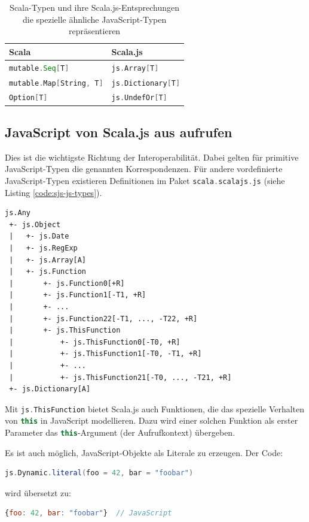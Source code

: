 \documentclass[a4paper, 12pt, hidelinks, listof=totoc, listoftables=totoc, bibliography=totoc]{scrreprt}
\newcommand{\scala}[1]{\lstinline[language=Scala, style=inline]|#1|}
\newcommand{\js}[1]{\lstinline[language=JavaScript, style=inline]|#1|}
\begin{document}
\medskip

\begin{table}[!h]
\begin{tabular}{|l|l|}
\hline \textbf{Scala}                 & \textbf{Scala.js} \\ 
\hline \scala{mutable.Seq[T]}         & \scala{js.Array[T]} \\ 
\hline \scala{mutable.Map[String, T]} & \scala{js.Dictionary[T]} \\ 
\hline \scala{Option[T]}              & \scala{js.UndefOr[T]} \\ 
\hline 
\end{tabular}
\caption{Scala-Typen und ihre Scala.js-Entsprechungen die  spezielle ähnliche JavaScript-Typen repräsentieren \cite{scalajs.DJI}}
\label{table:type-non-correspondance}
\end{table}

\medskip


\subsection{JavaScript von Scala.js aus aufrufen}

Dies ist die wichtigste Richtung der Interoperabilität. Dabei gelten für primitive JavaScript-Typen die genannten Korrespondenzen. Für andere vordefinierte JavaScript-Typen existieren Definitionen im Paket \scala{scala.scalajs.js} (siehe Listing \ref{code:sjs-js-types}).

\begin{lstlisting}[caption={Scala.js-Typhierarchie für vordefinierte JavaScript-Typen. (Quelle: \cite{scalajs.DCJ})}, label={code:sjs-js-types}]
js.Any
 +- js.Object
 |   +- js.Date
 |   +- js.RegExp
 |   +- js.Array[A]
 |   +- js.Function
 |       +- js.Function0[+R]
 |       +- js.Function1[-T1, +R]
 |       +- ...
 |       +- js.Function22[-T1, ..., -T22, +R]
 |       +- js.ThisFunction
 |           +- js.ThisFunction0[-T0, +R]
 |           +- js.ThisFunction1[-T0, -T1, +R]
 |           +- ...
 |           +- js.ThisFunction21[-T0, ..., -T21, +R]
 +- js.Dictionary[A]
\end{lstlisting}

Mit \scala{js.ThisFunction} bietet Scala.js auch Funktionen, die das spezielle Verhalten von \js{this} in JavaScript modellieren. Dazu wird einer solchen Funktion als erster Parameter das \js{this}-Argument (der Aufrufkontext) übergeben.

Es ist auch möglich, JavaScript-Objekte als Literale zu erzeugen. Der Code:
\begin{lstlisting}[language=Scala, style=snippet]
js.Dynamic.literal(foo = 42, bar = "foobar")
\end{lstlisting}
wird übersetzt zu:
\begin{lstlisting}[language=JavaScript, style=snippet]
{foo: 42, bar: "foobar"}  // JavaScript
\end{lstlisting}
\end{document}
